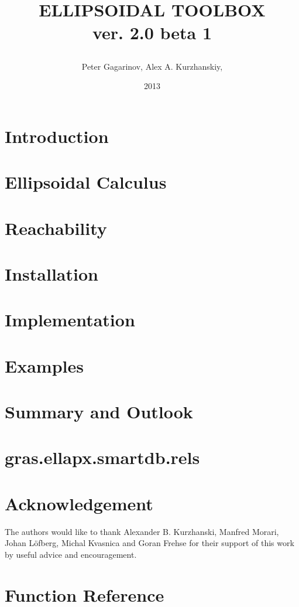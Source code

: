 \documentclass{report}
\title{
\easyfigure[ht][0.7\textwidth]{logo.eps}{}{}
ELLIPSOIDAL TOOLBOX%
\\
\normalsize{ver. 2.0 beta 1}
\author{Peter Gagarinov, Alex A. Kurzhanskiy,}
\date{2013}
}
\begin{document}
\maketitle
\tableofcontents

\chapter{Introduction}\label{ch_intro}


\chapter{Ellipsoidal Calculus}\label{ch_ellcalc}


\chapter{Reachability}\label{ch_reachability}


\chapter{Installation}\label{ch_install}


\chapter{Implementation}\label{ch_implementation}


\chapter{Examples}\label{ch_examples}


\chapter{Summary and Outlook}\label{ch_summary}


\chapter{gras.ellapx.smartdb.rels}\label{ch_ellTube}


\chapter*{Acknowledgement}
The authors would like to thank Alexander B. Kurzhanski,
Manfred Morari, Johan L{\"o}fberg, Michal Kvasnica and Goran Frehse
for their support of this work by useful advice and encouragement.



\appendix
\chapter{Function Reference}\label{appendix_a}

\end{document}
